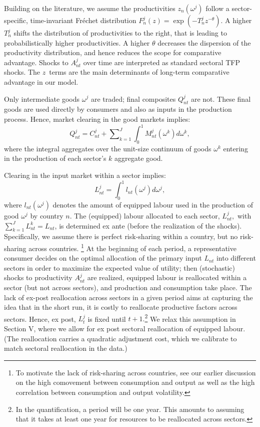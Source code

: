 \documentclass{article}
\begin{document}
Building on the literature, we assume the productivities $z_{n}(\omega ^{j})$
follow a sector-specific, time-invariant Fr\'{e}chet distribution $%
F_{n}^{j}(z)=\exp (-T_{n}^{j}z^{-\theta })$. A higher $T_{n}^{j}$ shifts the
distribution of productivities to the right, that is leading to
probabilistically higher productivities. A higher $\theta $ decreases the
dispersion of the productivity distribution, and hence reduces the scope for
comparative advantage. Shocks to $A_{nt}^{j}$ over time are interpreted as
standard sectoral TFP shocks. The $z$\ terms are the main determinants of
long-term comparative advantage in our model.

Only intermediate goods $\omega ^{j}$ are traded; final composites $%
Q_{nt}^{j}$ are not. These final goods are used directly by consumers and
also as inputs in the production process. Hence, market clearing in the good
markets implies: 
\[
Q_{nt}^{j}=C_{nt}^{j}+\sum\nolimits_{k=1}^{J}\int_{0}^{1}M_{nt}^{j}(\omega
^{k})d\omega ^{k},
\]%
where the integral aggregates over the unit-size continuum of goods $\omega
^{k}$ entering in the production of each sector's $k$ aggregate good.

Clearing in the input market within a sector implies: 
\[
L_{nt}^{j}=\int_{0}^{1}l_{nt}(\omega ^{j})d\omega ^{j},
\]%
where $l_{nt}(\omega ^{j})$ denotes the amount of equipped labour used in
the production of good $\omega ^{j}$ by country $n$. The (equipped) labour
allocated to each sector, $L_{nt}^{j},$ with $\sum%
\nolimits_{k=1}^{J}L_{nt}^{k}=L_{nt}$, is determined ex ante (before the
realization of the shocks). Specifically, we assume there is perfect
risk-sharing within a country, but no risk-sharing across countries.%
\footnote{%
To motivate the lack of risk-sharing across countries, see our earlier
discussion on the high comovement between consumption and output as well as
the high correlation between consumption and output volatility.} At the
beginning of each period, a representative consumer decides on the optimal
allocation of the primary input $L_{nt}$ into different sectors in order to
maximize the expected value of utility; then (stochastic) shocks to
productivity $A_{nt}^{j}$ are realized, equipped labour is reallocated
within a sector (but not across sectors), and production and consumption
take place. The lack of ex-post reallocation across sectors in a given
period aims at capturing the idea that in the short run, it is costly to
reallocate productive factors across sectors. Hence, ex post, $L_{t}^{j}$ is
fixed until $t+1.$\footnote{%
In the quantification, a period will be one year. This amounts to assuming
that it takes at least one year for resources to be reallocated across
sectors.} We relax this assumption in Section V, where we allow for ex post
sectoral reallocation of equipped labour. (The reallocation carries a
quadratic adjustment cost, which we calibrate to match sectoral reallocation
in the data.)
\end{document}
